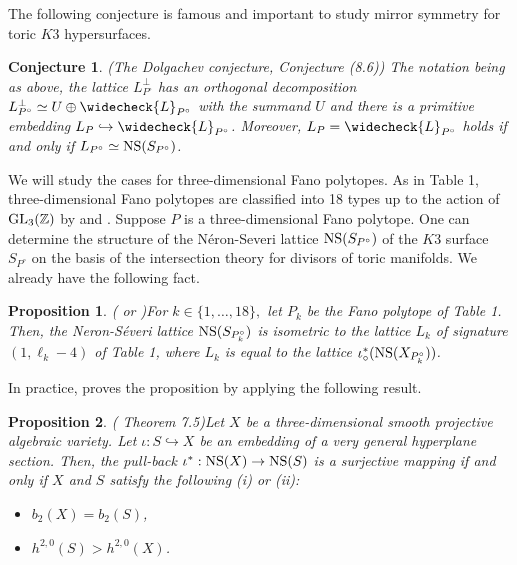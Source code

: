 \documentclass[10pt]{article}
\newtheorem{prop}{Proposition}[section]
\newtheorem{conj}{Conjecture}[section]
\begin{document}
The following conjecture is  famous and important to study mirror symmetry for toric $K3$ hypersurfaces.

\begin{conj}(The Dolgachev conjecture, \cite{D} Conjecture (8.6))
The notation being as above,
the lattice  $L_{P^\circ}^\perp$ has an orthogonal decomposition
$ L_{P^\circ}^\perp \simeq U \oplus \widecheck{L}_{P^\circ} $ with the summand $U$
and there is a primitive embedding $L_P \hookrightarrow \widecheck{L}_{P^\circ}$.
Moreover, $L_P = \widecheck{L}_{P^\circ}$ holds if and only if $L_{P^\circ} \simeq {\rm NS}(S_{P^\circ})$.
\end{conj}



We will study the cases for  three-dimensional Fano polytopes.
As in Table 1,
three-dimensional Fano polytopes are classified into 18 types  up to the action of ${\rm GL}_3(\mathbb{Z})$ by \cite{BToric} and \cite{WW}.
Suppose $P$ is a three-dimensional Fano polytope.
One can determine the structure of the N\'eron-Severi lattice ${\rm NS}(S_{P^\circ})$ of the $K3$ surface $S_{P^\circ}$
on the basis of the intersection theory for  divisors of toric manifolds.
We already have the following fact.

\begin{prop} (\cite{K2} or \cite{Mase})\label{PropLatticeDual}
 For $k\in \{1,\ldots, 18\},$
 let $P_k$ be the Fano polytope of Table 1. 
 Then,
the Neron-S\'everi lattice ${\rm NS}(S_{P_k^\circ})$ is isometric to the lattice $L_k$ of signature $(1,\ell_k-4)$ of Table 1,
where $L_k$ is equal to the lattice $\iota_\circ^* ({\rm NS} (X_{P_k^\circ}))$.
\end{prop}


In practice,   \cite{K2} proves the proposition by applying the following  result.

 
 \begin{prop} (\cite{Mo} Theorem 7.5)\label{PropMoishezon}
Let $X$ be a three-dimensional smooth  projective algebraic variety.
Let $\iota : S\hookrightarrow X$ be an embedding of a very general hyperplane section.
Then, the pull-back $\iota^*: {\rm NS}(X) \rightarrow {\rm NS}(S)$ is a surjective mapping 
if and only if 
$X $ and $S$ satisfy the following (i) or (ii):
\begin{itemize}

\item[(i)] $b_2(X)=b_2(S)$,

\item[(ii)] $h^{2,0} (S) > h^{2,0}(X)$.

\end{itemize} 
\end{prop}
\end{document}

